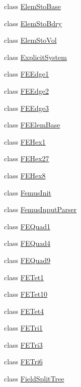 \begin{DoxyCompactItemize}
\item 
class \mbox{\hyperlink{classfemus_1_1_elem_sto_base}{Elem\+Sto\+Base}}
\item 
class \mbox{\hyperlink{classfemus_1_1_elem_sto_bdry}{Elem\+Sto\+Bdry}}
\item 
class \mbox{\hyperlink{classfemus_1_1_elem_sto_vol}{Elem\+Sto\+Vol}}
\item 
class \mbox{\hyperlink{classfemus_1_1_explicit_system}{Explicit\+System}}
\item 
class \mbox{\hyperlink{classfemus_1_1_f_e_edge1}{F\+E\+Edge1}}
\item 
class \mbox{\hyperlink{classfemus_1_1_f_e_edge2}{F\+E\+Edge2}}
\item 
class \mbox{\hyperlink{classfemus_1_1_f_e_edge3}{F\+E\+Edge3}}
\item 
class \mbox{\hyperlink{classfemus_1_1_f_e_elem_base}{F\+E\+Elem\+Base}}
\item 
class \mbox{\hyperlink{classfemus_1_1_f_e_hex1}{F\+E\+Hex1}}
\item 
class \mbox{\hyperlink{classfemus_1_1_f_e_hex27}{F\+E\+Hex27}}
\item 
class \mbox{\hyperlink{classfemus_1_1_f_e_hex8}{F\+E\+Hex8}}
\item 
class \mbox{\hyperlink{classfemus_1_1_femus_init}{Femus\+Init}}
\item 
class \mbox{\hyperlink{classfemus_1_1_femus_input_parser}{Femus\+Input\+Parser}}
\item 
class \mbox{\hyperlink{classfemus_1_1_f_e_quad1}{F\+E\+Quad1}}
\item 
class \mbox{\hyperlink{classfemus_1_1_f_e_quad4}{F\+E\+Quad4}}
\item 
class \mbox{\hyperlink{classfemus_1_1_f_e_quad9}{F\+E\+Quad9}}
\item 
class \mbox{\hyperlink{classfemus_1_1_f_e_tet1}{F\+E\+Tet1}}
\item 
class \mbox{\hyperlink{classfemus_1_1_f_e_tet10}{F\+E\+Tet10}}
\item 
class \mbox{\hyperlink{classfemus_1_1_f_e_tet4}{F\+E\+Tet4}}
\item 
class \mbox{\hyperlink{classfemus_1_1_f_e_tri1}{F\+E\+Tri1}}
\item 
class \mbox{\hyperlink{classfemus_1_1_f_e_tri3}{F\+E\+Tri3}}
\item 
class \mbox{\hyperlink{classfemus_1_1_f_e_tri6}{F\+E\+Tri6}}
\item 
class \mbox{\hyperlink{classfemus_1_1_field_split_tree}{Field\+Split\+Tree}}
\item 

\end{DoxyCompactItemize}
